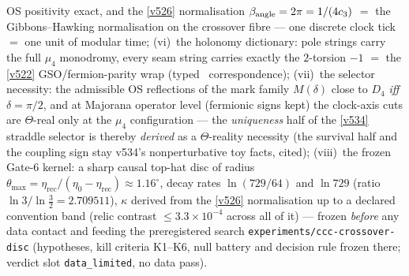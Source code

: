 OS positivity exact, and the \vref{v526} normalisation $\beta_{\mathrm{angle}}=2\pi=1/(4c_3)$
$=$ the Gibbons--Hawking normalisation on the crossover fibre --- one discrete clock tick $=$ one
unit of modular time; (vi)~the holonomy dictionary: pole strings carry the full $\mu_4$ monodromy,
every seam string carries exactly the $2$-torsion $-1$ $=$ the \vref{v522} GSO/fermion-parity wrap
(typed \mC\ correspondence); (vii)~the selector necessity: the admissible OS reflections of the
mark family $M(\delta)$ close to $D_4$ \emph{iff} $\delta=\pi/2$, and at Majorana operator level
(fermionic signs kept) the clock-axis cuts are $\Theta$-real only at the $\mu_4$ configuration ---
the \emph{uniqueness} half of the \vref{v534} straddle selector is thereby \emph{derived} as a
$\Theta$-reality necessity (the survival half and the coupling sign stay v534's nonperturbative toy
facts, cited); (viii)~the frozen Gate-6 kernel: a sharp causal top-hat disc of radius
$\theta_{\max}=\eta_{\mathrm{rec}}/(\eta_0-\eta_{\mathrm{rec}})\approx1.16^\circ$, decay rates
$\ln(729/64)$ and $\ln729$ (ratio $\ln3/\ln\tfrac32=2.709511$), $\kappa$ derived from the
\vref{v526} normalisation up to a declared convention band (relic contrast $\le3.3\times10^{-4}$
across all of it) --- frozen \emph{before} any data contact and feeding the preregistered search
\texttt{experiments/ccc-crossover-disc} (hypotheses, kill criteria K1--K6, null battery and
decision rule frozen there; verdict slot \texttt{data\_limited}, no data pass).

